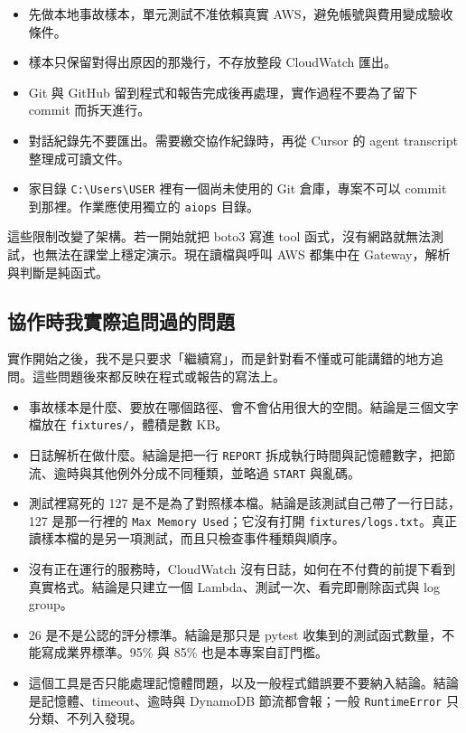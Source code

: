\documentclass[11pt]{article}
\begin{document}
\begin{itemize}
    \item 先做本地事故樣本，單元測試不准依賴真實 AWS，避免帳號與費用變成驗收條件。
    \item 樣本只保留對得出原因的那幾行，不存放整段 CloudWatch 匯出。
    \item Git 與 GitHub 留到程式和報告完成後再處理，實作過程不要為了留下 commit 而拆天進行。
    \item 對話紀錄先不要匯出。需要繳交協作紀錄時，再從 Cursor 的 agent transcript 整理成可讀文件。
    \item 家目錄 \texttt{C:\textbackslash Users\textbackslash USER} 裡有一個尚未使用的 Git 倉庫，專案不可以 commit 到那裡。作業應使用獨立的 \texttt{aiops} 目錄。
\end{itemize}

這些限制改變了架構。若一開始就把 boto3 寫進 tool 函式，沒有網路就無法測試，也無法在課堂上穩定演示。現在讀檔與呼叫 AWS 都集中在 Gateway，解析與判斷是純函式。

\subsection{協作時我實際追問過的問題}

實作開始之後，我不是只要求「繼續寫」，而是針對看不懂或可能講錯的地方追問。這些問題後來都反映在程式或報告的寫法上。

\begin{itemize}
    \item 事故樣本是什麼、要放在哪個路徑、會不會佔用很大的空間。結論是三個文字檔放在 \texttt{fixtures/}，體積是數 KB。
    \item 日誌解析在做什麼。結論是把一行 \texttt{REPORT} 拆成執行時間與記憶體數字，把節流、逾時與其他例外分成不同種類，並略過 \texttt{START} 與亂碼。
    \item 測試裡寫死的 127 是不是為了對照樣本檔。結論是該測試自己帶了一行日誌，127 是那一行裡的 \texttt{Max Memory Used}；它沒有打開 \texttt{fixtures/logs.txt}。真正讀樣本檔的是另一項測試，而且只檢查事件種類與順序。
    \item 沒有正在運行的服務時，CloudWatch 沒有日誌，如何在不付費的前提下看到真實格式。結論是只建立一個 Lambda、測試一次、看完即刪除函式與 log group。
    \item 26 是不是公認的評分標準。結論是那只是 pytest 收集到的測試函式數量，不能寫成業界標準。95\% 與 85\% 也是本專案自訂門檻。
    \item 這個工具是否只能處理記憶體問題，以及一般程式錯誤要不要納入結論。結論是記憶體、timeout、逾時與 DynamoDB 節流都會報；一般 \texttt{RuntimeError} 只分類、不列入發現。
\end{itemize}
\end{document}
